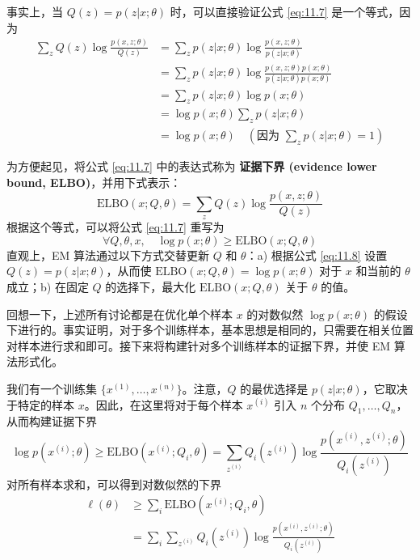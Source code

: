 事实上，当 $Q(z) = p(z|x; \theta)$ 时，可以直接验证公式 \eqref{eq:11.7} 是一个等式，因为
\begin{align*}
    \sum_z Q(z) \log \frac{p(x, z; \theta)}{Q(z)} &= \sum_z p(z|x; \theta) \log \frac{p(x, z; \theta)}{p(z|x; \theta)} \\
    &= \sum_z p(z|x; \theta) \log \frac{p(x, z; \theta) p(x; \theta)}{p(z|x; \theta) p(x; \theta)} \\
    &= \sum_z p(z|x; \theta) \log p(x; \theta) \\
    &= \log p(x; \theta) \sum_z p(z|x; \theta) \\
    &= \log p(x; \theta) \quad (\text{因为 } \sum_z p(z|x; \theta) = 1)
\end{align*}

为方便起见，将公式 \eqref{eq:11.7} 中的表达式称为 \textbf{证据下界 (evidence lower bound, ELBO)}，并用下式表示：
\begin{equation}
    \text{ELBO}(x; Q, \theta) = \sum_z Q(z) \log \frac{p(x, z; \theta)}{Q(z)}
    \label{eq:11.9}
\end{equation}
根据这个等式，可以将公式 \eqref{eq:11.7} 重写为
\begin{equation}
    \forall Q, \theta, x, \quad \log p(x; \theta) \geq \text{ELBO}(x; Q, \theta)
    \label{eq:11.10}
\end{equation}
直观上，EM 算法通过以下方式交替更新 $Q$ 和 $\theta$：a) 根据公式 \eqref{eq:11.8} 设置 $Q(z) = p(z|x; \theta)$，从而使 $\text{ELBO}(x; Q, \theta) = \log p(x; \theta)$ 对于 $x$ 和当前的 $\theta$ 成立；b) 在固定 $Q$ 的选择下，最大化 $\text{ELBO}(x; Q, \theta)$ 关于 $\theta$ 的值。

回想一下，上述所有讨论都是在优化单个样本 $x$ 的对数似然 $\log p(x; \theta)$ 的假设下进行的。事实证明，对于多个训练样本，基本思想是相同的，只需要在相关位置对样本进行求和即可。接下来将构建针对多个训练样本的证据下界，并使 EM 算法形式化。

我们有一个训练集 $\{x^{(1)}, \dots, x^{(n)}\}$。注意，$Q$ 的最优选择是 $p(z|x; \theta)$，它取决于特定的样本 $x$。因此，在这里将对于每个样本 $x^{(i)}$ 引入 $n$ 个分布 $Q_1, \dots, Q_n$，从而构建证据下界
\[
    \log p(x^{(i)}; \theta) \geq \text{ELBO}(x^{(i)}; Q_i, \theta) = \sum_{z^{(i)}} Q_i(z^{(i)}) \log \frac{p(x^{(i)}, z^{(i)}; \theta)}{Q_i(z^{(i)})}
\]
对所有样本求和，可以得到对数似然的下界
\begin{align}
    \ell(\theta) 
    &\geq \sum_i \text{ELBO}(x^{(i)}; Q_i, \theta) \label{eq:11.11}\\
    &= \sum_i \sum_{z^{(i)}} Q_i(z^{(i)}) \log \frac{p(x^{(i)}, z^{(i)}; \theta)}{Q_i(z^{(i)})} \nonumber
\end{align}

